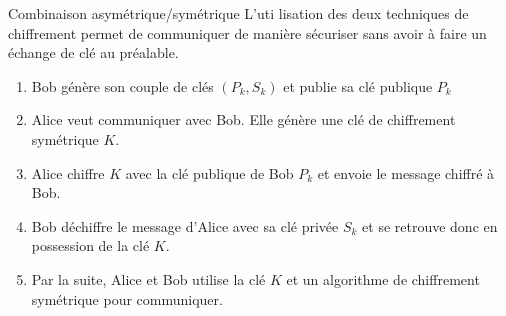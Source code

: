 \begin{frame}{Combinaison asymétrique/symétrique}
  L'uti lisation des deux techniques de chiffrement permet de communiquer de manière sécuriser sans avoir à faire un échange de clé au préalable.

  \begin{enumerate}
    \item Bob génère son couple de clés $(P_k,S_k)$ et publie sa clé publique $P_k$
    \item Alice veut communiquer avec Bob. Elle génère une clé de chiffrement symétrique $K$.
    \item Alice chiffre $K$ avec la clé publique de Bob $P_k$ et envoie le message chiffré à Bob.
    \item Bob déchiffre le message d'Alice avec sa clé privée $S_k$ et se retrouve donc en possession de la clé $K$.
    \item Par la suite, Alice et Bob utilise la clé $K$ et un algorithme de chiffrement symétrique pour communiquer.
  \end{enumerate}
\end{frame}